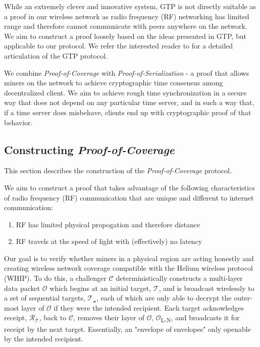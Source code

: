 \documentclass[letterpaper,11pt]{article}
\def\proofofcoverage/{\textit{Proof-of-Coverage}}
\begin{document}
While an extremely clever and innovative system, GTP is not directly suitable as a proof in our wireless network as radio frequency (RF) networking has limited range and therefore cannot communicate with peers anywhere on the network. We aim to construct a proof loosely based on the ideas presented in GTP, but applicable to our protocol. We refer the interested reader to \cite{gtp} for a detailed articulation of the GTP protocol.\newline

We combine \proofofcoverage/ with \textit{Proof-of-Serialization} - a proof that allows miners on the network to achieve cryptographic time consensus among decentralized client. We aim to achieve rough time synchronization in a secure way that does not depend on any particular time server, and in such a way that, if a time server does misbehave, clients end up with cryptographic proof of that behavior.

\subsection{Constructing \proofofcoverage/}

This section describes the construction of the \proofofcoverage/ protocol.\newline

We aim to construct a proof that takes advantage of the following characteristics of radio frequency (RF) communication that are unique and different to internet communication:

\begin{enumerate}
	\item RF has limited physical propogation and therefore distance
	\item RF travels at the speed of light with (effectively) no latency
\end{enumerate}

Our goal is to verify whether miners in a physical region are acting honestly and creating wireless network coverage compatible with the Helium wireless protocol (WHIP). To do this, a challenger $\mathcal{C}$ deterministically constructs a multi-layer data packet $\mathcal{O}$ which begins at an initial target, $\mathcal{T}$, and is broadcast wirelessly to a set of sequential targets, $\mathcal{T_n}$, each of which are only able to decrypt the outer-most layer of $\mathcal{O}$ if they were the intended recipient. Each target acknowledges receipt, $\mathcal{R_T}$, back to $\mathcal{C}$, removes their layer of $\mathcal{O}$, $\mathcal{O}$\textsubscript{L-N}, and broadcasts it for receipt by the next target. Essentially, an "envelope of envelopes" only openable by the intended recipient.\newline
\end{document}
